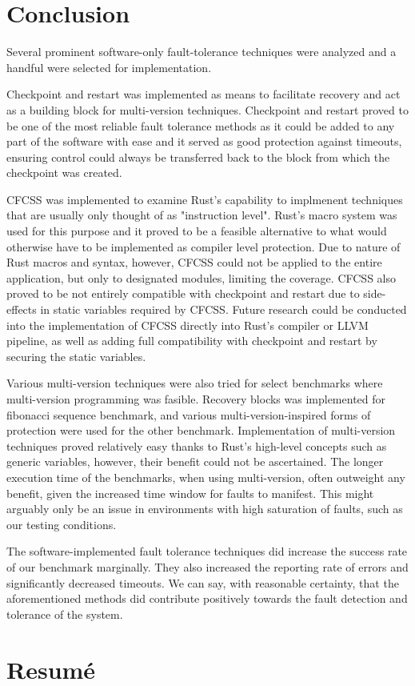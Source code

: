 \documentclass[12pt, letterpaper]{article}
\begin{document}


\clearpage


\clearpage
\section{Conclusion}

Several prominent software-only fault-tolerance techniques were analyzed and a handful were selected for implementation. 

Checkpoint and restart was implemented as means to facilitate recovery and act as a building block for multi-version techniques. Checkpoint and restart proved to be one of the most reliable fault tolerance methods as it could be added to any part of the software with ease and it served as good protection against timeouts, ensuring control could always be transferred back to the block from which the checkpoint was created.

CFCSS was implemented to examine Rust's capability to implmenent techniques that are usually only thought of as "instruction level". Rust's macro system was used for this purpose and it proved to be a feasible alternative to what would otherwise have to be implemented as compiler level protection. Due to nature of Rust macros and syntax, however, CFCSS could not be applied to the entire application, but only to designated modules, limiting the coverage. CFCSS also proved to be not entirely compatible with checkpoint and restart due to side-effects in static variables required by CFCSS. Future research could be conducted into the implementation of CFCSS directly into Rust's compiler or LLVM pipeline, as well as adding full compatibility with checkpoint and restart by securing the static variables.

Various multi-version techniques were also tried for select benchmarks where multi-version programming was fasible. Recovery blocks was implemented for fibonacci sequence benchmark, and various multi-version-inspired forms of protection were used for the other benchmark. Implementation of multi-version techniques proved relatively easy thanks to Rust's high-level concepts such as generic variables, however, their benefit could not be ascertained. The longer execution time of the benchmarks, when using multi-version, often outweight any benefit, given the increased time window for faults to manifest. This might arguably only be an issue in environments with high saturation of faults, such as our testing conditions.

The software-implemented fault tolerance techniques did increase the success rate of our benchmark marginally. They also increased the reporting rate of errors and significantly decreased timeouts. We can say, with reasonable certainty, that the aforementioned methods did contribute positively towards the fault detection and tolerance of the system.

\clearpage
\section{Resumé}

\newpage
\printbibliography
\end{document}
